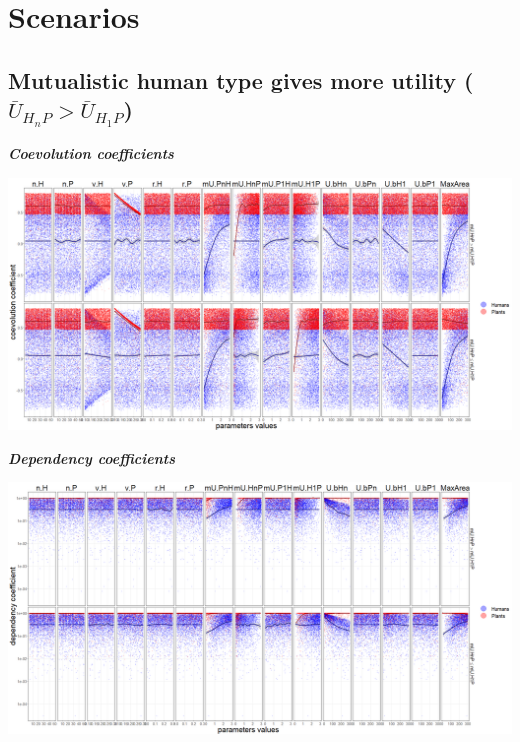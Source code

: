 \documentclass[]{book}
\begin{document}
\newpage

\hypertarget{scenarios}{%
\section{Scenarios}\label{scenarios}}

\hypertarget{mutualistic-human-type-gives-more-utility-baru_h_np-baru_h_1p}{%
\subsection{\texorpdfstring{Mutualistic human type gives more utility (\(\bar{U}_{H_{n}P}> \bar{U}_{H_{1}P}\))}{Mutualistic human type gives more utility (\textbackslash{}bar\{U\}\_\{H\_\{n\}P\}\textgreater{} \textbackslash{}bar\{U\}\_\{H\_\{1\}P\})}}\label{mutualistic-human-type-gives-more-utility-baru_h_np-baru_h_1p}}


\textbf{\emph{Coevolution coefficients}}

\includegraphics[width=1\linewidth]{plots/5_multiplePar-coevo-humanImprove-ggplot}

\textbf{\emph{Dependency coefficients}}

\includegraphics[width=1\linewidth]{plots/5_multiplePar-depend-humanImprove-ggplot}
\end{document}
